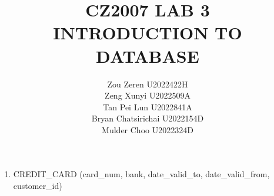 \documentclass[12pt]{article}
\begin{document}
\title{CZ2007 LAB 3\\
\large INTRODUCTION TO DATABASE}
\date{}
\author{
    Zou Zeren U2022422H\\
    Zeng Xunyi U2022509A\\
    Tan Pei Lun U2022841A\\
    Bryan Chatsirichai U2022154D\\
    Mulder Choo U2022324D
}
\maketitle\thispagestyle{fancy}

\begin{enumerate}
\item CREDIT\_CARD (card\_num, bank, date\_valid\_to, date\_valid\_from, customer\_id) 




\end{enumerate}
\end{document}

